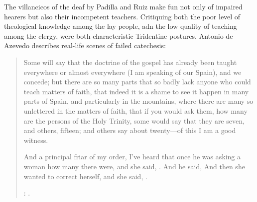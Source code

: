 The villancicos of the deaf by Padilla and Ruiz make fun not only of impaired hearers but also their incompetent teachers.
Critiquing both the poor level of theological knowledge among the lay people, adn the low quality of teaching among the clergy, were both characteristic Tridentine postures.
Antonio de Azevedo describes real-life scenes of failed catechesis:
\begin{quotation}
Some will say that the doctrine of the gospel has already been taught everywhere or almost everywhere (I am speaking of our Spain), and we concede;
but there are so many parts that so badly lack anyone who could teach matters of faith,
that indeed it is a shame to see it happen in many parts of Spain, and particularly in the  mountains,
where there are many so unlettered  in the matters of faith,
that if you would ask them, how many are the persons of the Holy Trinity, some would say that they are seven, and others, fifteen; and others say about twenty---of this I am a good witness.

And a principal friar of my order, I've heard that once he was asking a woman how many  there were, and she said, .
And he said, 
And then she wanted to correct herself, and she said, .%
  \begin{Footnote}
  \Autocite[26]{Azevedo:Catecismo}:
  .
  \end{Footnote}
\end{quotation}

